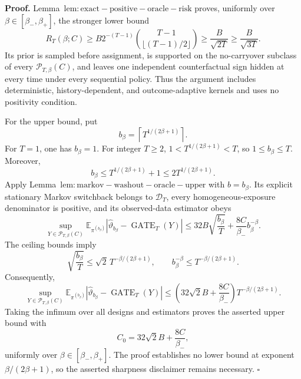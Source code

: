 \textbf{Proof.} Lemma~\(\mathrm{lem:exact-positive-oracle-risk}\) proves, uniformly over \(\beta\in[\beta_-,\beta_+]\), the stronger lower bound
\[
R_T(\beta;C)\ge B2^{-(T-1)}\binom{T-1}{\lfloor(T-1)/2\rfloor}\ge \frac{B}{\sqrt{2T}}\ge\frac{B}{\sqrt{3T}}.
\]
Its prior is sampled before assignment, is supported on the no-carryover subclass of every \(\mathcal P_{T,\beta}(C)\), and leaves one independent counterfactual sign hidden at every time under every sequential policy. Thus the argument includes deterministic, history-dependent, and outcome-adaptive kernels and uses no positivity condition.

For the upper bound, put
\[
b_\beta=\left\lceil T^{1/(2\beta+1)}\right\rceil.
\]
For \(T=1\), one has \(b_\beta=1\). For integer \(T\ge2\), \(1<T^{1/(2\beta+1)}<T\), so \(1\le b_\beta\le T\). Moreover,
\[
b_\beta\le T^{1/(2\beta+1)}+1\le2T^{1/(2\beta+1)}.
\]
Apply Lemma~\(\mathrm{lem:markov-washout-oracle-upper}\) with \(b=b_\beta\). Its explicit stationary Markov switchback belongs to \(\mathcal D_T\), every homogeneous-exposure denominator is positive, and its observed-data estimator obeys
\[
\sup_{Y\in\mathcal P_{T,\beta}(C)}
\mathbb E_{\pi^{(b_\beta)}}
\left|\widehat\vartheta_{b_\beta}-\operatorname{GATE}_T(Y)\right|
\le32B\sqrt{\frac{b_\beta}{T}}+\frac{8C}{\beta_-}b_\beta^{-\beta}.
\]
The ceiling bounds imply
\[
\sqrt{\frac{b_\beta}{T}}\le\sqrt2\,T^{-\beta/(2\beta+1)},
\qquad
b_\beta^{-\beta}\le T^{-\beta/(2\beta+1)}.
\]
Consequently,
\[
\sup_{Y\in\mathcal P_{T,\beta}(C)}
\mathbb E_{\pi^{(b_\beta)}}
\left|\widehat\vartheta_{b_\beta}-\operatorname{GATE}_T(Y)\right|
\le
\left(32\sqrt2 B+\frac{8C}{\beta_-}\right)T^{-\beta/(2\beta+1)}.
\]
Taking the infimum over all designs and estimators proves the asserted upper bound with
\[
C_0=32\sqrt2 B+\frac{8C}{\beta_-},
\]
uniformly over \(\beta\in[\beta_-,\beta_+]\). The proof establishes no lower bound at exponent \(\beta/(2\beta+1)\), so the asserted sharpness disclaimer remains necessary. \(\square\)